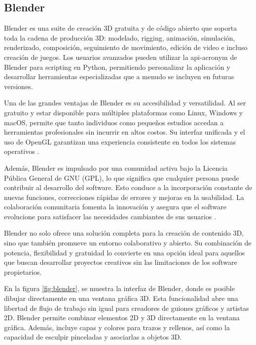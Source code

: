 \subsection{Blender}

Blender es una suite de creación 3D gratuita y de código abierto que soporta toda la cadena de producción 3D: modelado, rigging, animación, simulación, renderizado, composición, seguimiento de movimiento, edición de video e incluso creación de juegos. Los usuarios avanzados pueden utilizar la \acrshort{api-acronym} de Blender para scripting en Python, permitiendo personalizar la aplicación y desarrollar herramientas especializadas que a menudo se incluyen en futuras versiones.

Una de las grandes ventajas de Blender es su accesibilidad y versatilidad. Al ser gratuito y estar disponible para múltiples plataformas como Linux, Windows y macOS, permite que tanto individuos como pequeños estudios accedan a herramientas profesionales sin incurrir en altos costos. Su interfaz unificada y el uso de OpenGL garantizan una experiencia consistente en todos los sistemas operativos \cite{Blender}.

Además, Blender es impulsado por una comunidad activa bajo la Licencia Pública General de GNU (GPL), lo que significa que cualquier persona puede contribuir al desarrollo del software. Esto conduce a la incorporación constante de nuevas funciones, correcciones rápidas de errores y mejoras en la usabilidad. La colaboración comunitaria fomenta la innovación y asegura que el software evolucione para satisfacer las necesidades cambiantes de sus usuarios \cite{Blender1}.

Blender no solo ofrece una solución completa para la creación de contenido 3D, sino que también promueve un entorno colaborativo y abierto. Su combinación de potencia, flexibilidad y gratuidad lo convierte en una opción ideal para aquellos que buscan desarrollar proyectos creativos sin las limitaciones de los software propietarios.

 En la figura \ref{fig:blender}, se muestra la interfaz de Blender, donde es posible dibujar directamente en una ventana gráfica 3D. Esta funcionalidad abre una libertad de flujo de trabajo sin igual para creadores de guiones gráficos y artistas 2D. Blender permite combinar elementos 2D y 3D directamente en la ventana gráfica. Además, incluye capas y colores para trazos y rellenos, así como la capacidad de esculpir pinceladas y asociarlas a objetos 3D.


